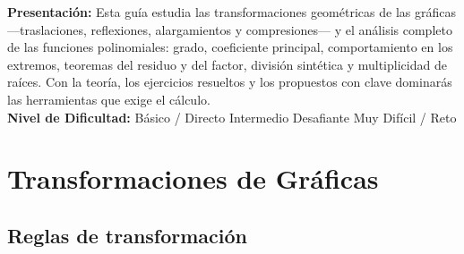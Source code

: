 \documentclass[12pt, letterpaper]{article}
\begin{document}

\vspace{4pt}
\begin{cuadroinfo}
  \small
  \textbf{Presentación:} Esta guía estudia las transformaciones geométricas de las gráficas —traslaciones, reflexiones, alargamientos y compresiones— y el análisis completo de las funciones polinomiales: grado, coeficiente principal, comportamiento en los extremos, teoremas del residuo y del factor, división sintética y multiplicidad de raíces. Con la teoría, los ejercicios resueltos y los propuestos con clave dominarás las herramientas que exige el cálculo.
  \\[4pt]
  \textbf{Nivel de Dificultad:}\quad
  \facil{} Básico / Directo \quad
  \medio{} Intermedio \quad
  \dificil{} Desafiante \quad
  \muyDificil{} Muy Difícil / Reto
\end{cuadroinfo}

\vspace{8pt}

\section{Transformaciones de Gráficas}

\subsection{Reglas de transformación}
\end{document}
